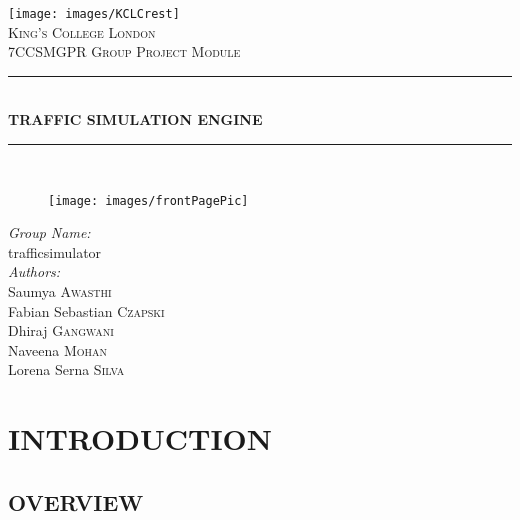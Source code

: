 \documentclass[11pt,a4paper]{article}
\newcommand{\HRule}{\rule{\linewidth}{0.5mm}}
\newcommand{\mydate}{\formatdate{26}{3}{2015}}
\begin{document}
\begin{titlepage}
	\begin{center}
		\texttt{[image: images/KCLCrest]}\\[0.5cm]
		 \textsc{\LARGE King's College London}\\	[0.8cm]
		 \textsc{\Large 7CCSMGPR Group Project Module}\\[0.3cm]
		 
		 \HRule \\[0.1cm]
		 	{\huge \bfseries TRAFFIC SIMULATION ENGINE\\[0.1cm]}
		 \HRule \\[0.8cm]

 \begin{figure}[h]
			\texttt{[image: images/frontPagePic]}
			\centering
		\end{figure}
		 
		 \noindent
		 \begin{minipage}{0.4\textwidth}
		 	\begin{center} \large
		 		\emph{Group Name:}\\
			 	\LARGE traffic\textunderscore simulator\\[0.3cm]
			 	
			 	\emph{Authors:}\\
		 		\large Saumya \textsc{Awasthi}\\
		 		\large Fabian Sebastian \textsc{Czapski}\\
		 		\large Dhiraj \textsc{Gangwani}\\
		 		\large Naveena \textsc{Mohan}\\
				\large Lorena Serna \textsc{Silva}\\
				\large \date{March 26, 2015}
		 	\end{center}	
		 \end{minipage}
		
	

		 \mydate
	\end{center}
\end{titlepage}

\tableofcontents

\newpage
\section{\textbf{INTRODUCTION}}
	\subsection{OVERVIEW} 
\end{document}
